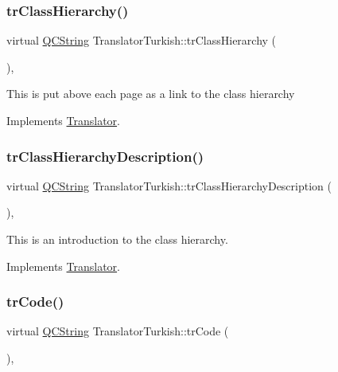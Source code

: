 \subsubsection{\texorpdfstring{trClassHierarchy()}{trClassHierarchy()}}
{\footnotesize\ttfamily virtual \mbox{\hyperlink{class_q_c_string}{Q\+C\+String}} Translator\+Turkish\+::tr\+Class\+Hierarchy (\begin{DoxyParamCaption}{ }\end{DoxyParamCaption})\hspace{0.3cm}{\ttfamily [inline]}, {\ttfamily [virtual]}}

This is put above each page as a link to the class hierarchy 

Implements \mbox{\hyperlink{class_translator}{Translator}}.

\mbox{\label{class_translator_turkish_ad8916cde9c32b0f90c169b442fde254a}} 
\subsubsection{\texorpdfstring{trClassHierarchyDescription()}{trClassHierarchyDescription()}}
{\footnotesize\ttfamily virtual \mbox{\hyperlink{class_q_c_string}{Q\+C\+String}} Translator\+Turkish\+::tr\+Class\+Hierarchy\+Description (\begin{DoxyParamCaption}{ }\end{DoxyParamCaption})\hspace{0.3cm}{\ttfamily [inline]}, {\ttfamily [virtual]}}

This is an introduction to the class hierarchy. 

Implements \mbox{\hyperlink{class_translator}{Translator}}.

\mbox{\label{class_translator_turkish_a67896eb272aca0864fafe201b9770f7a}} 
\subsubsection{\texorpdfstring{trCode()}{trCode()}}
{\footnotesize\ttfamily virtual \mbox{\hyperlink{class_q_c_string}{Q\+C\+String}} Translator\+Turkish\+::tr\+Code (\begin{DoxyParamCaption}{ }\end{DoxyParamCaption})\hspace{0.3cm}{\ttfamily [inline]}, {\ttfamily [virtual]}}

